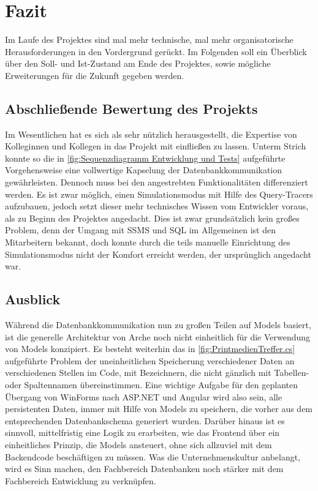 \documentclass[11pt,toc=sectionentrywithoutdots, 
headheight=44pt, headings=optiontoheadandtoc, hyperfootnotes=false, hypertexnames=false]{scrartcl}
\begin{document}


\section{Fazit}
Im Laufe des Projektes sind mal mehr technische, mal mehr organisatorische Herausforderungen in den Vordergrund gerückt. Im Folgenden soll ein Überblick über den Soll- und Ist-Zustand am Ende des Projektes, sowie mögliche Erweiterungen für die Zukunft gegeben werden.

\subsection{Abschließende Bewertung des Projekts}
Im Wesentlichen hat es sich als sehr nützlich herausgestellt, die Expertise von Kolleginnen und Kollegen in das Projekt mit einfließen zu lassen. Unterm Strich konnte so die in \ref{fig:Sequenzdiagramm Entwicklung und Tests} aufgeführte Vorgehensweise eine vollwertige Kapselung der Datenbankkommunikation gewährleisten. Dennoch muss bei den angestrebten Funktionalitäten differenziert werden. Es ist zwar möglich, einen Simulationsmodus mit Hilfe des Query-Tracers aufzubauen, jedoch setzt dieser mehr technisches Wissen vom Entwickler voraus, als zu Beginn des Projektes angedacht. Dies ist zwar grundsätzlich kein großes Problem, denn der Umgang mit SSMS und SQL im Allgemeinen ist den Mitarbeitern bekannt, doch konnte durch die teils manuelle Einrichtung des Simulationsmodus nicht der Komfort erreicht werden, der ursprünglich angedacht war. 

\subsection{Ausblick}
Während die Datenbankkommunikation nun zu großen Teilen auf Models basiert, ist die generelle Architektur von Arche noch nicht einheitlich für die Verwendung von Models konzipiert. Es besteht weiterhin das in \ref{fig:PrintmedienTreffer.cs} aufgeführte Problem der uneinheitlichen Speicherung verschiedener Daten an verschiedenen Stellen im Code, mit Bezeichnern, die nicht gänzlich mit Tabellen- oder Spaltennamen übereinstimmen. Eine wichtige Aufgabe für den geplanten Übergang von WinForms nach ASP.NET und Angular wird also sein, alle persistenten Daten, immer mit Hilfe von Models zu speichern, die vorher aus dem entsprechenden Datenbankschema generiert wurden. Darüber hinaus ist es sinnvoll, mittelfristig eine Logik zu erarbeiten, wie das Frontend über ein einheitliches Prinzip, die Models ansteuert, ohne sich allzuviel mit dem Backendcode beschäftigen zu müssen. Was die Unternehmenskultur anbelangt, wird es Sinn machen, den Fachbereich Datenbanken noch stärker mit dem Fachbereich Entwicklung zu verknüpfen.
\end{document}
